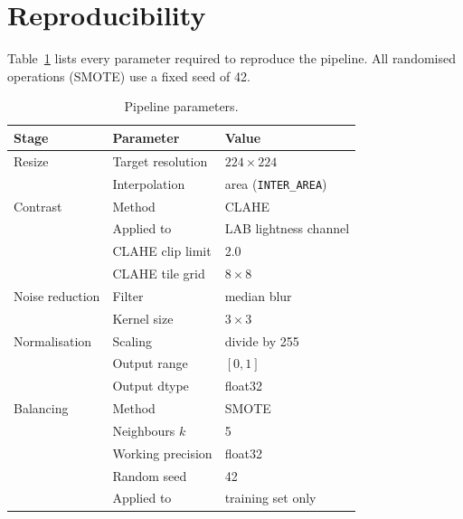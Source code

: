 \documentclass[11pt,a4paper]{article}
\begin{document}
\section{Reproducibility}
\label{sec:repro}

Table~\ref{tab:params} lists every parameter required to reproduce the
pipeline. All randomised operations (SMOTE) use a fixed seed of \num{42}.

\begin{table}[t]
  \centering
  \caption{Pipeline parameters.}
  \label{tab:params}
  \begin{tabular}{lll}
    \toprule
    Stage & Parameter & Value \\
    \midrule
    Resize             & Target resolution          & $224\times224$ \\
                       & Interpolation              & area (\texttt{INTER\_AREA}) \\
    \midrule
    Contrast           & Method                     & CLAHE \\
                       & Applied to                 & LAB lightness channel \\
                       & CLAHE clip limit           & 2.0 \\
                       & CLAHE tile grid            & $8\times8$ \\
    \midrule
    Noise reduction    & Filter                     & median blur \\
                       & Kernel size                & $3\times3$ \\
    \midrule
    Normalisation      & Scaling                    & divide by 255 \\
                       & Output range               & $[0,1]$ \\
                       & Output dtype               & float32 \\
    \midrule
    Balancing          & Method                     & SMOTE \\
                       & Neighbours $k$             & 5 \\
                       & Working precision          & float32 \\
                       & Random seed                & 42 \\
                       & Applied to                 & training set only \\
    \bottomrule
  \end{tabular}
\end{table}
\end{document}
